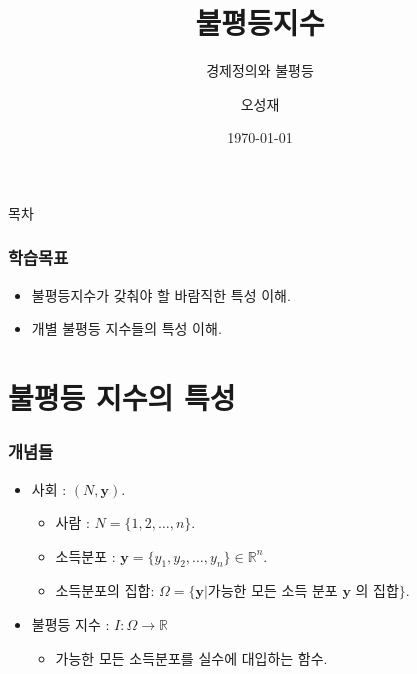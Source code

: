 \documentclass[aspectratio=169,xcolor=dvipsnames,]{beamer}
\title[불평등지수]{불평등지수} %
\subtitle{경제정의와 불평등}
\author[오성재]{오성재}
\institute[HNU] %
{
    한남대학교 \\
    탈메이지 교양학부 \\
}
\date{\today} %
\newcommand{\R}{\mathbb{R}}
\newcommand{\y}{\mathbf{y}}
\begin{document}
\begin{frame}
    \titlepage
\end{frame}

\begin{frame}{목차}
    \tableofcontents
\end{frame}

\begin{frame}[<+->]
\frametitle{학습목표}
    \begin{itemize}
        \item 불평등지수가 갖춰야 할 바람직한 특성 이해.
        \item 개별 불평등 지수들의 특성 이해.
    \end{itemize}
\end{frame}

\section{불평등 지수의 특성}

\begin{frame}[<+->]
\frametitle{개념들}
    \begin{itemize}
        \item 사회 : $(N, \mathbf{y})$.
        \begin{itemize}
            \item 사람 : $N = \{1,2, \ldots , n \}$.
            \item 소득분포 : $\mathbf{y} = \{y_1,y_2, \ldots , y_n \} \in \R ^n$.
            \item 소득분포의 집합: $\Omega = \{ \y | \text{가능한 모든 소득 분포 } \y \text{ 의 집합}\}$.
        \end{itemize}
        \item 불평등 지수 : $I : \Omega \rightarrow \R$
        \begin{itemize}
            \item 가능한 모든 소득분포를 실수에 대입하는 함수.
        \end{itemize}
    \end{itemize}
\end{frame}
\end{document}
